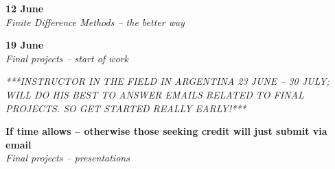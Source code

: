 \documentclass[10pt,a4paper]{amsart}
\begin{document}
\begin{minipage}{\linewidth}
\noindent \textbf{12 June}\\
\textit{Finite Difference Methods -- the better way}
\vspace{12pt}
\end{minipage}

\begin{minipage}{\linewidth}
\noindent \textbf{19 June}\\
\textit{Final projects -- start of work}
\vspace{12pt}
\end{minipage}

\noindent\emph{***INSTRUCTOR IN THE FIELD IN ARGENTINA 23 JUNE -- 30 JULY; WILL DO HIS BEST TO ANSWER EMAILS RELATED TO FINAL PROJECTS. SO GET STARTED REALLY EARLY!***}\\

\begin{minipage}{\linewidth}
\noindent \textbf{If time allows -- otherwise those seeking credit will just submit via email}\\
\textit{Final projects -- presentations}
\vspace{12pt}
\end{minipage}
\end{document}
